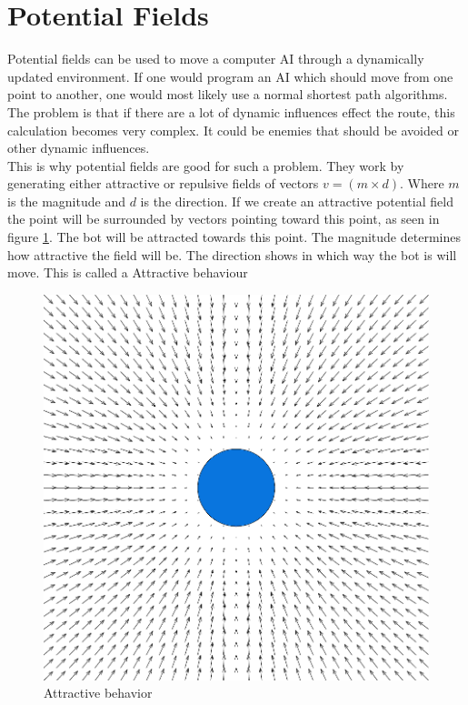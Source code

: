 \section{Potential Fields}
	Potential fields can be used to move a computer AI through a dynamically updated environment. 
	If one would program an AI which should move from one point to another, one would most likely use a normal shortest path algorithms. 
	The problem is that if there are a lot of dynamic influences effect the route, this calculation becomes very complex. It could be 
	enemies that should be avoided or other dynamic influences. \\
	
	This is why potential fields are good for such a problem. They work by generating either attractive or repulsive fields of vectors $v=(m\times d )$. 
	Where $m$ is the magnitude and $d$ is the direction. 
	If we create an attractive potential field the point will be surrounded by vectors pointing toward this point, 
	as seen in figure \ref{fig:seekbehavior}. 
	The bot will be attracted towards this point. The magnitude determines how attractive the field will be. The direction shows in which way the bot is will move. This is called a Attractive behaviour 
		
	\begin{figure}[H]
		\begin{center}
			\includegraphics[scale=0.3]{Figures/Potentialfields/seek.png}
			\caption{Attractive behavior\cite{pft}}\label{fig:seekbehavior}
		\end{center}
	\end{figure}
	
